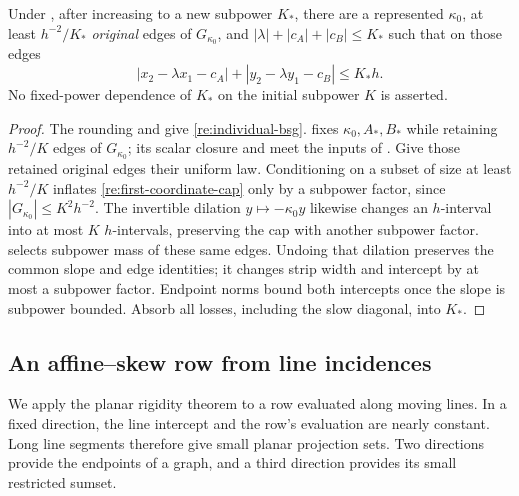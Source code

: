 \begin{proposition}\label{re:retained-edge-rigidity}
Under , after increasing to a new subpower
\(K_*\), there are a represented \(\kappa_0\), at least
\(h^{-2}/K_*\) \emph{original} edges of \(G_{\kappa_0}\), and
\(|\lambda|+|c_A|+|c_B|\le K_*\) such that on those edges
\[
 |x_2-\lambda x_1-c_A|+
 |y_2-\lambda y_1-c_B|\le K_*h.
\]
No fixed-power dependence of \(K_*\) on the initial subpower
\(K\) is asserted.
\end{proposition}
\begin{proof}
The rounding and  give \eqref{re:individual-bsg}.
 fixes \(\kappa_0,A_*,B_*\) while retaining
\(h^{-2}/K\) edges of \(G_{\kappa_0}\); its scalar closure and
 meet the inputs of
.  Give those retained original edges
their uniform law.  Conditioning on a subset of size at least
\(h^{-2}/K\) inflates \eqref{re:first-coordinate-cap} only by a
subpower factor, since \(|G_{\kappa_0}|\le K^2h^{-2}\).
The invertible dilation \(y\mapsto-\kappa_0y\) likewise changes
an \(h\)-interval into at most \(K\) \(h\)-intervals, preserving
the cap with another subpower factor.  
selects subpower mass of these same edges.  Undoing that dilation
preserves the common slope and edge identities; it changes strip
width and intercept by at most a subpower factor.  Endpoint norms
bound both intercepts once the slope is subpower bounded.
Absorb all losses, including the slow diagonal, into \(K_*\).
\end{proof}

\subsection{An affine--skew row from line incidences}

We apply the planar rigidity theorem to a row evaluated along moving
lines.  In a fixed direction, the line intercept and the row's
evaluation are nearly constant.  Long line segments therefore give
small planar projection sets.  Two directions provide the endpoints
of a graph, and a third direction provides its small restricted
sumset.

